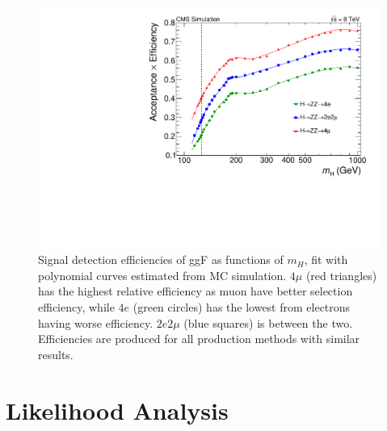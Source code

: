 \begin{figure}[htbp]
\begin{center}
\includegraphics[width=.6\linewidth]{HiggsDiscovery/figures/Efficiency_ggH_8TeV.pdf}
\caption[Signal Efficiency of Gluon Fusion as a Function of $m_H$]{Signal detection efficiencies of ggF as functions of $m_H$, fit with polynomial curves estimated from MC simulation. $4\mu$ (red triangles) has the highest relative efficiency as muon have better selection efficiency, while $4e$ (green circles) has the lowest from electrons having worse efficiency. $2e2\mu$ (blue squares) is between the two. Efficiencies are produced for all production methods with similar results.}
\label{fig:HiggsEffic}
\end{center}
\end{figure}

\section{Likelihood Analysis}
\label{sec:ZZ4lAnalysis}

